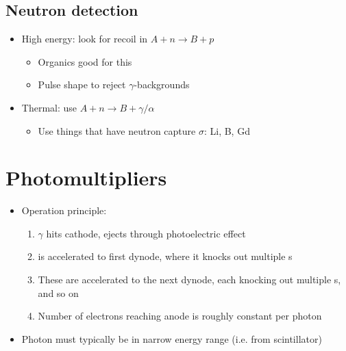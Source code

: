 \subsection{Neutron detection}
\begin{itemize}
  \item High energy: look for recoil in $A+n\rightarrow B+p$
  \begin{itemize}
    \item Organics good for this
    \item Pulse shape to reject $\gamma$-backgrounds
  \end{itemize}
  \item Thermal: use $A+n\rightarrow B+\gamma/\alpha$
  \begin{itemize}
    \item Use things that have neutron capture $\sigma$: Li, B, Gd
  \end{itemize}
\end{itemize}

\section{Photomultipliers}
\begin{itemize}
  \item Operation principle:
  \begin{enumerate}
    \item $\gamma$ hits cathode, ejects \el through photoelectric effect
    \item \el is accelerated to first dynode, where it knocks out multiple \el s
    \item These are accelerated to the next dynode, each knocking out multiple \el s, and so on
    \item Number of electrons reaching anode is roughly constant per photon
  \end{enumerate}
  \item Photon must typically be in narrow energy range (i.e. from scintillator)
\end{itemize}

